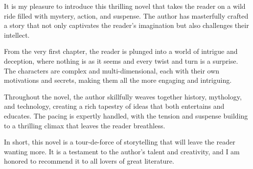 It is my pleasure to introduce this thrilling novel that takes the reader on a wild ride filled with mystery, action, and suspense. The author has masterfully crafted a story that not only captivates the reader's imagination but also challenges their intellect.

From the very first chapter, the reader is plunged into a world of intrigue and deception, where nothing is as it seems and every twist and turn is a surprise. The characters are complex and multi-dimensional, each with their own motivations and secrets, making them all the more engaging and intriguing.

Throughout the novel, the author skillfully weaves together history, mythology, and technology, creating a rich tapestry of ideas that both entertains and educates. The pacing is expertly handled, with the tension and suspense building to a thrilling climax that leaves the reader breathless.

In short, this novel is a tour-de-force of storytelling that will leave the reader wanting more. It is a testament to the author's talent and creativity, and I am honored to recommend it to all lovers of great literature.